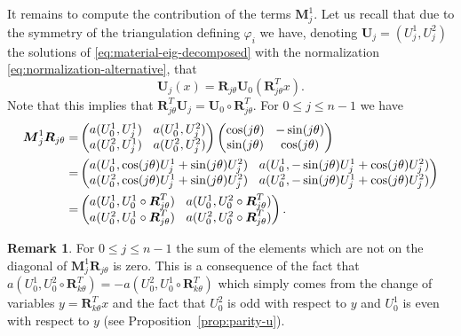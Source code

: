 \documentclass[11pt]{article}
\numberwithin{equation}{section}\newtheorem*{jepEnonce}{\jepEnonceTitle}\newenvironment{enonce*}[1]{\def\jepEnonceTitle{#1}\jepEnonce}{\endjepEnonce}\newtheorem*{conj*}{Conjecture}
\newcommand{\colsep}{\arraycolsep4.5pt}
\theoremstyle{plain}
\theoremstyle{definition}
\newtheorem{rem}[thm]{Remark}
\newcommand{\bo}[1]{{\boldsymbol#1}}
\begin{document}
It remains to compute the contribution of the terms $\bo M_j^1$. Let us recall that due to the symmetry of the triangulation defining $\varphi_i$ we have, denoting $\bo U_j = (U_j^1,U_j^2)$ the solutions of \eqref{eq:material-eig-decomposed} with the normalization \eqref{eq:normalization-alternative}, that
\[
\bo U_j(x) = \bo R_{j\theta} \bo U_0(\bo R_{j\theta}^Tx).
\]
Note that this implies that $\bo R_{j\theta}^T \bo U_j = \bo U_0 \circ \bo R_{j\theta}^T$.
For $0\leq j \leq n-1$ we have\vspace*{-3pt}
\begin{align*}
\bo M_j^1 \bo R_{j\theta} = & \colsep\begin{pmatrix}
a(U_0^1,U_j^1) & a(U_0^1,U_j^2) \\
a(U_0^2,U_j^1) & a(U_0^2,U_j^2)
\end{pmatrix}
\begin{pmatrix}
\cos (j\theta) & -\sin(j\theta) \\
\sin(j\theta) & \cos(j\theta)
\end{pmatrix}\\
= &\colsep \begin{pmatrix}
a(U_0^1,\cos(j\theta)U_j^1+\sin(j\theta)U_j^2) & a(U_0^1,-\sin(j\theta)U_j^1+\cos(j\theta)U_j^2) \\
a(U_0^2,\cos(j\theta)U_j^1+\sin(j\theta)U_j^2) & a(U_0^2,-\sin(j\theta)U_j^1+\cos(j\theta)U_j^2)
\end{pmatrix} \\
= & \colsep\begin{pmatrix}
a(U_0^1,U_0^1\circ \bo R_{j\theta}^T) & a(U_0^1,U_0^2\circ \bo R_{j\theta}^T) \\
a(U_0^2,U_0^1\circ \bo R_{j\theta}^T) & a(U_0^2,U_0^2\circ \bo R_{j\theta}^T)
\end{pmatrix}.
\end{align*}

\begin{rem}
For $0\leq j \leq n-1$ the sum of the elements which are not on the diagonal of $\bo M_j^1 \bo R_{j\theta}$ is zero. This is a consequence of the fact that $a(U_0^1,U_0^2\circ\bo R_{k\theta}^T) = -a(U_0^2,U_0^1\circ\bo R_{k\theta}^T)$ which simply comes from the change of variables $y = \bo R_{k\theta}^Tx$ and the fact that $U_0^2$ is odd with respect to $y$ and $U_0^1$ is even with respect to $y$ (see Proposition~\ref{prop:parity-u}).
\label{rem:zerooffdiagsum-M1}
\end{rem}
\end{document}
